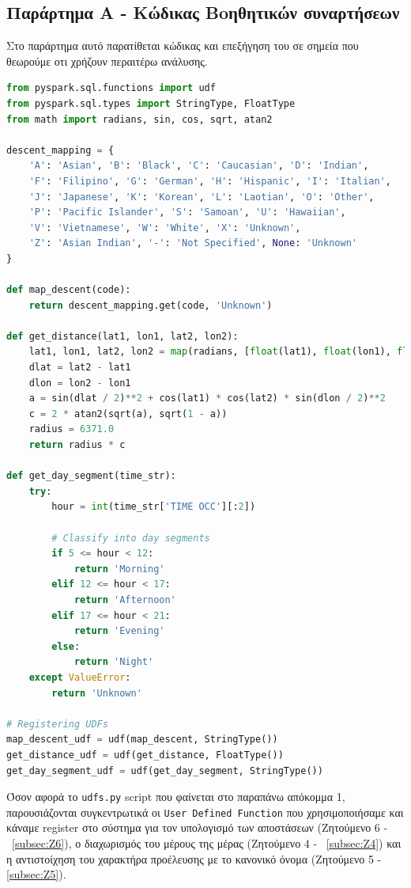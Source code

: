 \documentclass{article}
\begin{document}
\subsection{Παράρτημα Α - Kώδικας Boηθητικών συναρτήσεων}
\label{subsec:apend_A}
Στο παράρτημα αυτό παρατίθεται κώδικας και επεξήγηση του σε σημεία που θεωρούμε οτι χρήζουν περαιτέρω ανάλυσης. 
\begin{lstlisting}[language=Python,caption={UDF registration script}]
from pyspark.sql.functions import udf
from pyspark.sql.types import StringType, FloatType
from math import radians, sin, cos, sqrt, atan2

descent_mapping = {
    'A': 'Asian', 'B': 'Black', 'C': 'Caucasian', 'D': 'Indian',
    'F': 'Filipino', 'G': 'German', 'H': 'Hispanic', 'I': 'Italian',
    'J': 'Japanese', 'K': 'Korean', 'L': 'Laotian', 'O': 'Other',
    'P': 'Pacific Islander', 'S': 'Samoan', 'U': 'Hawaiian',
    'V': 'Vietnamese', 'W': 'White', 'X': 'Unknown',
    'Z': 'Asian Indian', '-': 'Not Specified', None: 'Unknown'
}

def map_descent(code):
    return descent_mapping.get(code, 'Unknown')

def get_distance(lat1, lon1, lat2, lon2):
    lat1, lon1, lat2, lon2 = map(radians, [float(lat1), float(lon1), float(lat2), float(lon2)])
    dlat = lat2 - lat1
    dlon = lon2 - lon1
    a = sin(dlat / 2)**2 + cos(lat1) * cos(lat2) * sin(dlon / 2)**2
    c = 2 * atan2(sqrt(a), sqrt(1 - a))
    radius = 6371.0
    return radius * c

def get_day_segment(time_str):
    try:
        hour = int(time_str['TIME OCC'][:2])

        # Classify into day segments
        if 5 <= hour < 12:
            return 'Morning'
        elif 12 <= hour < 17:
            return 'Afternoon'
        elif 17 <= hour < 21:
            return 'Evening'
        else:
            return 'Night'
    except ValueError:
        return 'Unknown'

# Registering UDFs
map_descent_udf = udf(map_descent, StringType())
get_distance_udf = udf(get_distance, FloatType())
get_day_segment_udf = udf(get_day_segment, StringType())
\end{lstlisting}
Όσον αφορά το \texttt{udfs.py} script που φαίνεται στο παραπάνω απόκομμα 1, παρουσιάζονται συγκεντρωτικά οι \texttt{User Defined Function}  που χρησιμοποιήσαμε και κάναμε  register  στο σύστημα για τον υπολογισμό των αποστάσεων (Ζητούμενο 6 - ~\ref{subsec:Z6}), ο διαχωρισμός του μέρους της μέρας (Ζητούμενο 4 - ~\ref{subsec:Z4}) και η αντιστοίχηση του χαρακτήρα προέλευσης με το κανονικό όνομα (Ζητούμενο 5 - \ref{subsec:Z5}).
\end{document}
